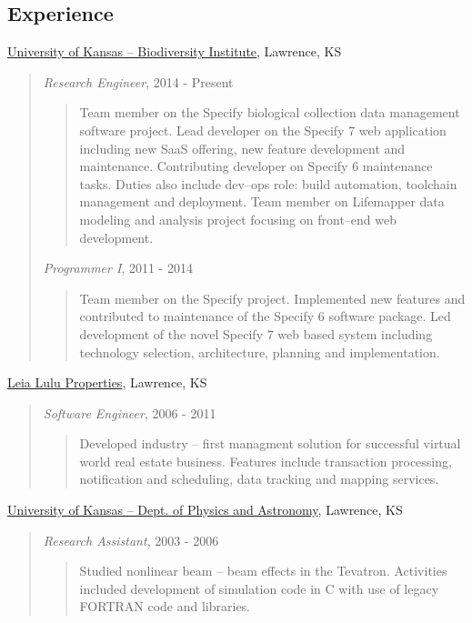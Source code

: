 \begin{resume}
\section{Experience}
\underline{University of Kansas -- Biodiversity Institute}, Lawrence, KS\\
\begin{quote}
\emph{Research Engineer}, 2014 - Present
\begin{quote}
Team member on the Specify biological collection data management
software project. Lead developer on the Specify 7 web application
including new SaaS offering, new feature development and
maintenance. Contributing developer on Specify 6 maintenance
tasks. Duties also include dev--ops role: build automation, toolchain
management and deployment. Team member on Lifemapper data modeling and
analysis project focusing on front--end web development.
\end{quote}

\emph{Programmer I}, 2011 - 2014
\begin{quote}
Team member on the Specify project. Implemented new features and
contributed to maintenance of the Specify 6 software package. Led
development of the novel Specify 7 web based system including
technology selection, architecture, planning and implementation.
\end{quote}
\end{quote}

\underline{Leia Lulu Properties}, Lawrence, KS\\
\begin{quote}
\emph{Software Engineer}, 2006 - 2011
\begin{quote}
Developed industry -- first managment solution for successful virtual world 
real estate business. Features include transaction processing, notification 
and scheduling, data tracking and mapping services.
\end{quote}
\end{quote}

\underline{University of Kansas -- Dept. of Physics and Astronomy},
Lawrence, KS\\

\begin{quote}
\emph{Research Assistant},  2003 - 2006
\begin{quote}
Studied nonlinear beam -- beam effects in the Tevatron.  Activities
included development of simulation code in C with use of legacy
FORTRAN code and libraries.
\end{quote}


\end{quote}
\end{resume}
